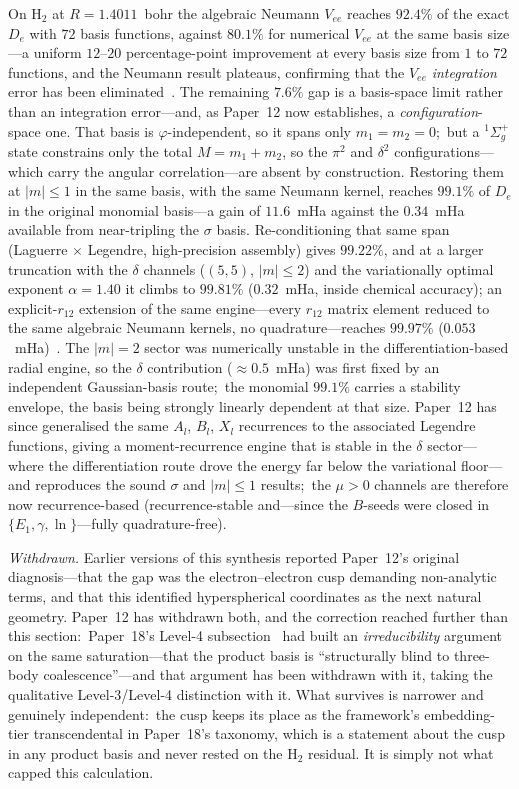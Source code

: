 \documentclass[aps,pra,twocolumn,superscriptaddress,longbibliography]{revtex4-2}
\begin{document}
On $\mathrm{H}_2$ at $R = 1.4011$~bohr the algebraic Neumann $V_{ee}$
reaches $92.4\%$ of the exact $D_e$ with $72$ basis functions, against
$80.1\%$ for numerical $V_{ee}$ at the same basis size---a uniform
$12$--$20$ percentage-point improvement at every basis size from $1$ to
$72$ functions, and the Neumann result plateaus, confirming that the
$V_{ee}$ \emph{integration} error has been
eliminated~\cite{loutey_paper12}.  The remaining $7.6\%$ gap is a
basis-space limit rather than an integration error---and, as Paper~12
now establishes, a \emph{configuration}-space one.  That basis is
$\varphi$-independent, so it spans only $m_1 = m_2 = 0$;\ but a
$^1\Sigma_g^+$ state constrains only the total $M = m_1 + m_2$, so the
$\pi^2$ and $\delta^2$ configurations---which carry the angular
correlation---are absent by construction.  Restoring them at
$|m| \le 1$ in the same basis, with the same Neumann kernel, reaches
$99.1\%$ of $D_e$ in the original monomial basis---a gain of
$11.6$~mHa against the $0.34$~mHa
available from near-tripling the $\sigma$ basis.  Re-conditioning that
same span (Laguerre $\times$ Legendre, high-precision assembly) gives
$99.22\%$, and at a larger truncation with the $\delta$ channels
($(5,5)$, $|m| \le 2$) and the variationally optimal exponent $\alpha = 1.40$
it climbs to $99.81\%$ ($0.32$~mHa, inside chemical accuracy); an explicit-$r_{12}$ extension of
the same engine---every $r_{12}$ matrix element reduced to the same
algebraic Neumann kernels, no quadrature---reaches $99.97\%$
($0.053$~mHa)~\cite{loutey_paper12}.  The
$|m| = 2$ sector was numerically unstable in the differentiation-based
radial engine, so the $\delta$ contribution (${\approx}0.5$~mHa) was
first fixed by an independent Gaussian-basis route;\ the monomial $99.1\%$
carries a stability envelope, the basis being strongly linearly
dependent at that size.  Paper~12 has since generalised the same
$A_l$, $B_l$, $X_l$ recurrences to the associated Legendre functions,
giving a moment-recurrence engine that is stable in the $\delta$
sector---where the differentiation route drove the energy far below
the variational floor---and reproduces the sound $\sigma$ and
$|m| \le 1$ results;\ the $\mu > 0$ channels are therefore now
recurrence-based
(recurrence-stable and---since the $B$-seeds were closed in
$\{E_1, \gamma, \ln\}$---fully quadrature-free).

\emph{Withdrawn.}  Earlier versions of this synthesis reported
Paper~12's original diagnosis---that the gap was the electron--electron
cusp demanding non-analytic terms, and that this identified hyperspherical coordinates as the next
natural geometry.  Paper~12 has withdrawn both, and the correction reached
further than this section:\ Paper~18's Level-4
subsection~\cite{loutey_paper18} had built an \emph{irreducibility}
argument on the same saturation---that the product basis is
``structurally blind to three-body coalescence''---and that argument has
been withdrawn with it, taking the qualitative Level-3/Level-4
distinction with it.  What survives is narrower and genuinely
independent:\ the cusp keeps its place as the framework's embedding-tier
transcendental in Paper~18's taxonomy, which is a statement about the
cusp in any product basis and never rested on the H$_2$ residual.  It is
simply not what capped this calculation.
\end{document}
